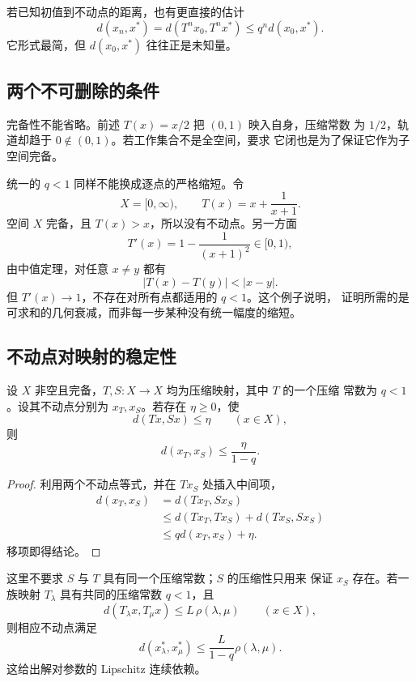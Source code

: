 若已知初值到不动点的距离，也有更直接的估计
\begin{equation}
\label{eq:contraction-direct-error}
 d(x_n,x^\ast)=d(T^nx_0,T^nx^\ast)
 \le q^n d(x_0,x^\ast).
\end{equation}
它形式最简，但 \(d(x_0,x^\ast)\) 往往正是未知量。

\subsection{两个不可删除的条件}

完备性不能省略。前述 \(T(x)=x/2\) 把 \((0,1)\) 映入自身，压缩常数
为 \(1/2\)，轨道却趋于 \(0\notin(0,1)\)。若工作集合不是全空间，要求
它闭也是为了保证它作为子空间完备。

统一的 \(q<1\) 同样不能换成逐点的严格缩短。令
\[
 X=[0,\infty),\qquad T(x)=x+\frac{1}{x+1}.
\]
空间 \(X\) 完备，且 \(T(x)>x\)，所以没有不动点。另一方面
\[
 T'(x)=1-\frac{1}{(x+1)^2}\in[0,1),
\]
由中值定理，对任意 \(x\ne y\) 都有
\[
 |T(x)-T(y)|<|x-y|.
\]
但 \(T'(x)\to1\)，不存在对所有点都适用的 \(q<1\)。这个例子说明，
证明所需的是可求和的几何衰减，而非每一步某种没有统一幅度的缩短。

\subsection{不动点对映射的稳定性}

\begin{theorem}[压缩映射的扰动估计]
\label{thm:contraction-perturbation}
设 \(X\) 非空且完备，\(T,S:X\to X\) 均为压缩映射，其中 \(T\) 的一个压缩
常数为 \(q<1\)。设其不动点分别为 \(x_T,x_S\)。若存在
\(\eta\ge0\)，使
\[
 d(Tx,Sx)\le\eta\qquad(x\in X),
\]
则
\[
 d(x_T,x_S)\le\frac{\eta}{1-q}.
\]
\end{theorem}

\begin{proof}
利用两个不动点等式，并在 \(Tx_S\) 处插入中间项，
\[
\begin{aligned}
 d(x_T,x_S)
 &=d(Tx_T,Sx_S)\\
 &\le d(Tx_T,Tx_S)+d(Tx_S,Sx_S)\\
 &\le qd(x_T,x_S)+\eta.
\end{aligned}
\]
移项即得结论。
\end{proof}

这里不要求 \(S\) 与 \(T\) 具有同一个压缩常数；\(S\) 的压缩性只用来
保证 \(x_S\) 存在。若一族映射 \(T_\lambda\) 具有共同的压缩常数
\(q<1\)，且
\[
 d(T_\lambda x,T_\mu x)\le L\,\rho(\lambda,\mu)
 \qquad(x\in X),
\]
则相应不动点满足
\begin{equation}
\label{eq:parametric-fixed-point-bound}
 d(x_\lambda^\ast,x_\mu^\ast)
 \le\frac{L}{1-q}\rho(\lambda,\mu).
\end{equation}
这给出解对参数的 Lipschitz 连续依赖。

